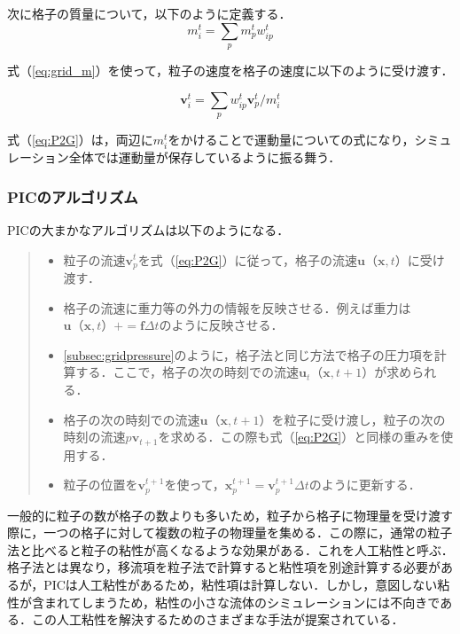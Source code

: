 \documentclass[a4j,12pt]{jreport}
\begin{document}
次に格子の質量について，以下のように定義する．
\begin{equation}\label{eq:grid_m}
m^t_i = \sum\limits_p m^t_pw^t_{ip}
\end{equation} 

式（\ref{eq:grid_m}）を使って，粒子の速度を格子の速度に以下のように受け渡す．

\begin{equation}\label{eq:P2G}
\bm{v}^t_i = \sum\limits_p w^t_{ip}\bm{v}^t_p / m^t_i
\end{equation} 

式（\ref{eq:P2G}）は，両辺に$m^t_i$をかけることで運動量についての式になり，シミュレーション全体では運動量が保存しているように振る舞う．

\subsubsection{PICのアルゴリズム} \label{subsec:PIC_algo}
PICの大まかなアルゴリズムは以下のようになる．
\begin{quote}
	\begin{itemize}
		\item 粒子の流速$\bm{v}^{t}_p$を式（\ref{eq:P2G}）に従って，格子の流速$\bm{u}（\bm{x},t）$に受け渡す．
		\item 格子の流速に重力等の外力の情報を反映させる．例えば重力は$\bm{u}（\bm{x},t） += \bm{f}\varDelta t$のように反映させる．
		\item \ref{subsec:gridpressure}のように，格子法と同じ方法で格子の圧力項を計算する．ここで，格子の次の時刻での流速$\bm{u}_t（\bm{x},t+1）$が求められる．
		\item 格子の次の時刻での流速$\bm{u}（\bm{x},t+1）$を粒子に受け渡し，粒子の次の時刻の流速$p\bm{v}_{t+1}$を求める．この際も式（\ref{eq:P2G}）と同様の重みを使用する．
		\item 粒子の位置を$\bm{v}^{t+1}_p$を使って，$\bm{x}^{t+1}_p = \bm{v}^{t+1}_p\varDelta t $のように更新する．
	\end{itemize}
\end{quote}

一般的に粒子の数が格子の数よりも多いため，粒子から格子に物理量を受け渡す際に，一つの格子に対して複数の粒子の物理量を集める．この際に，通常の粒子法と比べると粒子の粘性が高くなるような効果がある．これを人工粘性と呼ぶ．格子法とは異なり，移流項を粒子法で計算すると粘性項を別途計算する必要があるが，PICは人工粘性があるため，粘性項は計算しない．しかし，意図しない粘性が含まれてしまうため，粘性の小さな流体のシミュレーションには不向きである．この人工粘性を解決するためのさまざまな手法が提案されている．
\end{document}
